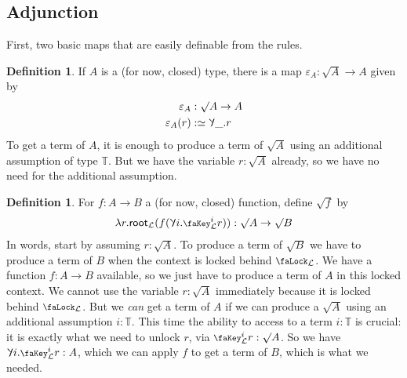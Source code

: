 \documentclass[10pt]{article} \usepackage{fullpage}
\theoremstyle{definition}
\newtheorem{definition}[theorem]{Definition}
\let\oldequiv\equiv%
\renewcommand{\equiv}{\simeq}
\newcommand{\defeq}{\oldequiv}
\newcommand{\rulen}[1]{\textsc{#1}}
\newcommand{\lock}{\mathchoice {\scalebox{0.8}{\text{\faLock}}}
  {\scalebox{0.8}{\text{\faLock}}} {\scalebox{0.5}{\text{\faLock}}}
  {\scalebox{0.4}{\text{\faLock}}} }
\newcommand{\key}{\mathchoice
  {\scalebox{0.8}{\text{\faKey}}} {\scalebox{0.8}{\text{\faKey}}}
  {\scalebox{0.5}{\text{\faKey}}} {\scalebox{0.4}{\text{\faKey}}} }
\newcommand{\Tiny}{\mathbb{T}}
\newcommand{\lockn}[1]{\mathcal{#1}}
\newcommand{\varkeye}[2]{\key_{#1}^{#2}}
\newcommand{\varkey}[2]{\varkeye{\lockn{#1}}{#2}}
\newcommand{\ctxlocke}[1]{\lock_{#1}}
\newcommand{\ctxlock}[1]{\ctxlocke{\lockn{#1}}}
\newcommand{\rformu}[1]{\surd #1}
\newcommand{\rintro}[2]{\mathsf{root}_{\lockn{#1}}(#2)}
\newcommand{\rbindsym}{\raisebox{-0.5pt}{\scalerel*{\reflectbox{\rotatebox[origin=c]{180}{$\lambda$}}}{\lambda}}}
\newcommand{\relim}[1]{\rbindsym #1}
\begin{document}

\subsection{Adjunction}

First, two basic maps that are easily definable from the rules.

\begin{definition}
  If $A$ is a (for now, closed) type, there is a map
  $\varepsilon_A : \rformu{A} \to A$ given by
  \begin{align*}
    \varepsilon_A &: \rformu{A} \to A \\
    \varepsilon_A(r) &:\defeq \relim{\_.r}
  \end{align*}
  To get a term of $A$, it is enough to produce a term of $\rformu{A}$
  using an additional assumption of type $\Tiny$. But we have the
  variable $r : \rformu{A}$ already, so we have no need for the
  additional assumption.
\end{definition}

\begin{definition}
  For $f : A \to B$ a (for now, closed) function, define $\rformu f$ by
  \begin{align*}
    \lambda r. \rintro{L}{f(\relim{i.\varkey{L}{i} r})} : \rformu A \to \rformu B
  \end{align*}
  In words, start by assuming $r : \rformu A$. To produce a term of
  $\rformu B$ we have to produce a term of $B$ when the context is
  locked behind $\ctxlock{L}$. We have a function $f : A \to B$
  available, so we just have to produce a term of $A$ in this locked
  context. We cannot use the variable $r : \rformu A$ immediately
  because it is locked behind $\ctxlock{L}$. But we \emph{can} get a
  term of $A$ if we can produce a $\rformu A$ using an additional
  assumption $i : \Tiny$. This time the ability to access to a term
  $i : \Tiny$ is crucial: it is exactly what we need to unlock $r$,
  via $\varkey{L}{i} r : \rformu{A}$. So we have
  $\relim{i.\varkey{L}{i} r} : A$, which we can apply $f$ to get a
  term of $B$, which is what we needed.
\end{definition}
\end{document}
